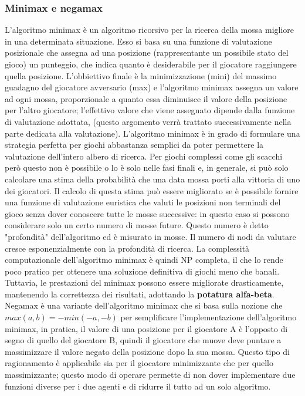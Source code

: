 \subsubsection{Minimax e negamax}
L'algoritmo minimax\cite{itwiki:125837390} è un algoritmo ricorsivo per la ricerca della mossa migliore in una determinata situazione. Esso si basa su una funzione di valutazione posizionale che assegna ad una posizione (rappresentante un possibile stato del gioco) un punteggio,
che indica quanto è desiderabile per il giocatore raggiungere quella posizione.
L'obbiettivo finale è la minimizzazione (mini) del massimo guadagno del giocatore avversario (max) e
l'algoritmo minimax assegna un valore ad ogni mossa, proporzionale a quanto essa diminuisce il valore della posizione per l'altro giocatore;
l'effettivo valore che viene assegnato dipende dalla funzione di valutazione adottata, (questo argomento verrà trattato successivamente nella parte dedicata alla valutazione).
L'algoritmo minimax è in grado di formulare una strategia perfetta per giochi abbastanza semplici da poter permettere 
la valutazione dell'intero albero di ricerca. Per giochi complessi come gli scacchi però questo non è possibile o lo è 
solo nelle fasi finali e, in generale, si può solo calcolare una stima della probabilità che una data mossa porti alla vittoria di uno dei giocatori.
Il calcolo di questa stima può essere migliorato se è possibile fornire una funzione di valutazione euristica che
valuti le posizioni non terminali del gioco senza dover conoscere tutte le mosse successive: in questo caso si possono
considerare solo un certo numero di mosse future. Questo numero è detto "profondità" dell'algoritmo ed è misurato
in mosse. Il numero di nodi da valutare cresce esponenzialmente con la profondità di ricerca. La complessità computazionale dell'algoritmo minimax è quindi 
NP completa, il che lo rende poco pratico per ottenere una soluzione definitiva di giochi meno che banali. Tuttavia, le prestazioni del minimax possono essere migliorate drasticamente,
mantenendo la correttezza dei risultati, adottando la \textbf{potatura alfa-beta}.
\\Negamax è una variante dell'algoritmo minimax che si basa sulla nozione che $max(a,b)= -min(-a,-b)$ per semplificare l'implementazione dell'algoritmo minimax,
in pratica, il valore di una posizione per il giocatore A è l'opposto di segno di quello del giocatore B, quindi il giocatore che muove deve puntare a massimizzare il valore negato della posizione
dopo la sua mossa. Questo tipo di ragionamento è applicabile sia per il giocatore minimizzante che per quello massimizzante; questo modo di operare permette di non dover implementare due funzioni diverse per i due agenti 
e di ridurre il tutto ad un solo algoritmo.



